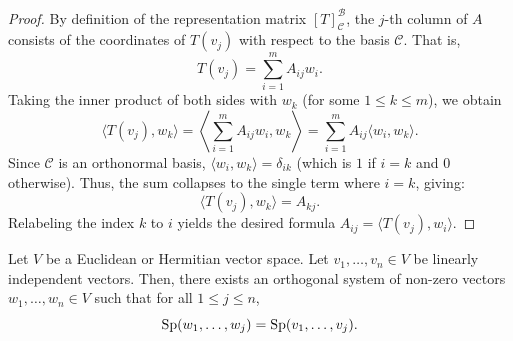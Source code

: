 \begin{proof}
    By definition of the representation matrix $[T]_{\mathcal{C}}^{\mathcal{B}}$, the $j$-th column of $A$ consists of the coordinates of $T(v_j)$ with respect to the basis $\mathcal{C}$. That is,
    \begin{equation*}
        T(v_j) = \sum_{i=1}^m A_{ij} w_i.
    \end{equation*}
    Taking the inner product of both sides with $w_k$ (for some $1 \leq k \leq m$), we obtain
    \begin{equation*}
        \langle T(v_j), w_k \rangle = \left\langle \sum_{i=1}^m A_{ij} w_i, w_k \right\rangle = \sum_{i=1}^m A_{ij} \langle w_i, w_k \rangle.
    \end{equation*}
    Since $\mathcal{C}$ is an orthonormal basis, $\langle w_i, w_k \rangle = \delta_{ik}$ (which is $1$ if $i=k$ and $0$ otherwise). Thus, the sum collapses to the single term where $i=k$, giving:
    \begin{equation*}
        \langle T(v_j), w_k \rangle = A_{kj}.
    \end{equation*}
    Relabeling the index $k$ to $i$ yields the desired formula $A_{ij} = \langle T(v_j), w_i \rangle$.
\end{proof}

\begin{theorem}
    \label{thm:gram_schmidt}
    Let $V$ be a Euclidean or Hermitian vector space. Let $v_1, \dots, v_n \in V$ be linearly independent vectors. Then, there exists an orthogonal system of non-zero vectors $w_1, \dots, w_n \in V$ such that for all $1 \leq j \leq n$,
    \begin{equation*}
        \operatorname{Sp}(w_1, \dots, w_j) = \operatorname{Sp}(v_1, \dots, v_j).
    \end{equation*}
\end{theorem}

